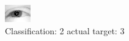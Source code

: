 \begin{figure}[h!]
\begin{center}
\includegraphics[width=0.60\columnwidth]{figures/ID2381_class_2_target_3.png}
\end{center}
\caption{ Classification: 2 actual target: 3}
\label{fig:ID2381_class_2_target_3}
\end{figure}
